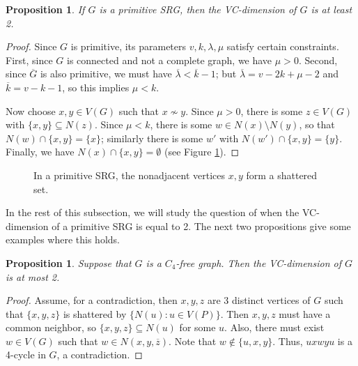\documentclass{article}
\newcommand\sm{\setminus}
\newtheorem{prop}[thm]{Proposition}
\theoremstyle{definition}
\begin{document}
\begin{prop} \label{Proposition primitive SRG 2}
    If $G$ is a primitive SRG, then the VC-dimension of $G$ is at least 2.
\end{prop}
\begin{proof}
    Since $G$ is primitive, its parameters $v,k,\lambda,\mu$ satisfy certain constraints. First, since $G$ is connected and not a complete graph, we have $\mu>0$. Second, since $\overline G$ is also primitive, we must have $\overline \lambda<\overline k-1$; but $\overline\lambda = v-2k+\mu-2$ and $\overline k= v-k-1$, so this implies $\mu<k$.

    Now choose $x,y\in V(G)$ such that $x\not\sim y$. Since $\mu >0$, there is some $z\in V(G)$ with $\{x,y\}\subseteq N(z)$. Since $\mu<k$, there is some $w\in N(x)\sm N(y)$, so that $N(w)\cap\{x,y\}=\{x\}$; similarly there is some $w'$ with $N(w')\cap\{x,y\}=\{y\}$. Finally, we have $N(x)\cap\{x,y\}=\emptyset$ (see Figure \ref{Figure SRG}).
\end{proof}
\begin{figure}[h]
\begin{center}
\end{center}
\caption{In a primitive SRG, the nonadjacent vertices $x,y$ form a shattered set.} \label{Figure SRG}
\end{figure}

In the rest of this subsection, we will study the question of when the VC-dimension of a primitive SRG is equal to 2. The next two propositions give some examples where this holds.

\begin{prop} \label{Proposition C4 free}
    Suppose that $G$ is a $C_4$-free graph. Then the VC-dimension of $G$ is at most 2.
\end{prop}
\begin{proof}
    Assume, for a contradiction, then $x,y,z$ are 3 distinct vertices of $G$ such that $\{x,y,z\}$ is shattered by $\{N(u):u\in V(P)\}.$ Then $x,y,z$ must have a common neighbor, so $\{x,y,z\}\subseteq N(u)$ for some $u$. Also, there must exist $w\in V(G)$ such that $w\in N(x,y,\overline z)$. Note that $w\not\in\{u,x,y\}$. Thus, $uxwyu$ is a 4-cycle in $G$, a contradiction. 
\end{proof}
\end{document}
